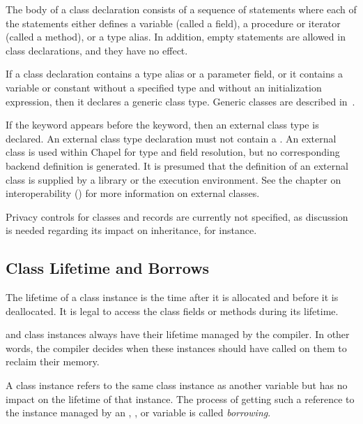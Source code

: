 The body of a class declaration consists of a sequence of statements
where each of the statements either defines a variable (called a
field), a procedure or iterator (called a method), or a type alias.  In addition, empty
statements are allowed in class declarations, and they have no effect.

If a class declaration contains a type alias or a parameter field, or it contains a variable or
constant without a specified type and without an initialization
expression, then it declares a generic class type.  Generic classes are described
in~.

If the  keyword appears before the  keyword, then an
external class type is declared.  An external class type declaration must not
contain a .  An external class is used within Chapel
for type and field resolution, but no corresponding backend definition is
generated.  It is presumed that the definition of an external class is supplied
by a library or the execution environment.  See the chapter on interoperability
() for more information on external classes.

\begin{future}
Privacy controls for classes and records are currently not specified,
as discussion is needed regarding its impact on inheritance, for
instance.
\end{future}

\subsection{Class Lifetime and Borrows}
\label{Class_Lifetime_and_Borrows}

The lifetime of a class instance is the time after it is allocated and
before it is deallocated. It is legal to access the class fields or
methods during its lifetime.

 and  class instances always have their lifetime
managed by the compiler. In other words, the compiler decides when these
instances should have  called on them to reclaim their
memory.

A  class instance refers to the same class instance as
another variable but has no impact on the lifetime of that instance. The
process of getting such a reference to the instance managed by an
, , or  variable is called
\emph{borrowing}.

